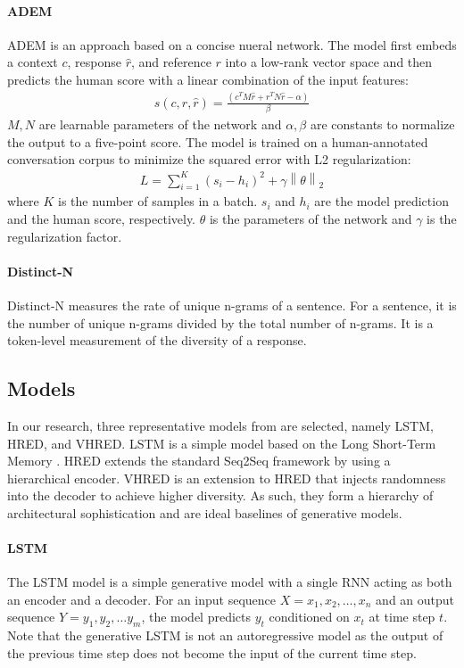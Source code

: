 \documentclass[conference]{IEEEtran}
\begin{document}
\paragraph{ADEM}
ADEM \cite{ADEM} is an approach based on a concise nueral network. The model first embeds a context $c$, response $\hat{r}$, and reference $r$ into a low-rank vector space and then predicts the human score with a linear combination of the input features:
\begin{align}
    s(c, r, \hat{r}) = \frac{(c^T M \hat{r} + r^T N \hat{r} - \alpha)}{\beta}
\end{align}
$M, N$ are learnable parameters of the network and $\alpha, \beta$ are constants to normalize the output to a five-point score. The model is trained on a human-annotated conversation corpus to minimize the squared error with L2 regularization:
\begin{align}
    L = \sum_{i=1}^{K} (s_i - h_i)^2 + \gamma \left\| \theta \right\| _2
\end{align}
where $K$ is the number of samples in a batch. $s_i$ and $h_i$ are the model prediction and the human score, respectively. $\theta$ is the parameters of the network and $\gamma$ is the regularization factor.

\paragraph{Distinct-N}
Distinct-N \cite{MMI} measures the rate of unique n-grams of a sentence. For a sentence, it is the number of unique n-grams divided by the total number of n-grams. It is a token-level measurement of the diversity of a response.

\subsection{Models}
In our research, three representative models from \cite{VHRED} are selected, namely LSTM, HRED, and VHRED. LSTM is a simple model based on the Long Short-Term Memory \cite{LSTM}. HRED extends the standard Seq2Seq framework by using a hierarchical encoder. VHRED is an extension to HRED that injects randomness into the decoder to achieve higher diversity. As such, they form a hierarchy of architectural sophistication and are ideal baselines of generative models.

\paragraph{LSTM}
The LSTM model is a simple generative model with a single RNN acting as both an encoder and a decoder. For an input sequence $X = x_1, x_2, \dots, x_n$ and an output sequence $Y = y_1, y_2, \dots y_m$, the model predicts $y_t$ conditioned on $x_t$ at time step $t$. Note that the generative LSTM is not an autoregressive model as the output of the previous time step does not become the input of the current time step.
\end{document}
